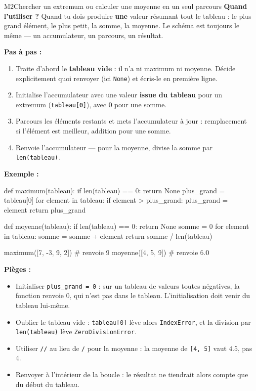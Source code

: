 \begin{fichemethode}{M2}{Chercher un extremum ou calculer une moyenne en un seul parcours}
\textbf{Quand l'utiliser ?} Quand tu dois produire \textbf{une} valeur résumant tout le
tableau : le plus grand élément, le plus petit, la somme, la moyenne. Le schéma est
toujours le même — un accumulateur, un parcours, un résultat.

\textbf{Pas à pas :}
\begin{enumerate}
  \item Traite d'abord le \textbf{tableau vide} : il n'a ni maximum ni moyenne. Décide
    explicitement quoi renvoyer (ici \lstinline{None}) et écris-le en première ligne.
  \item Initialise l'accumulateur avec une valeur \textbf{issue du tableau} pour un
    extremum (\lstinline{tableau[0]}), avec $0$ pour une somme.
  \item Parcours les éléments restants et mets l'accumulateur à jour : remplacement si
    l'élément est meilleur, addition pour une somme.
  \item Renvoie l'accumulateur — pour la moyenne, divise la somme par
    \lstinline{len(tableau)}.
\end{enumerate}

\textbf{Exemple :}
\begin{python}
def maximum(tableau):
    if len(tableau) == 0:
        return None
    plus_grand = tableau[0]
    for element in tableau:
        if element > plus_grand:
            plus_grand = element
    return plus_grand

def moyenne(tableau):
    if len(tableau) == 0:
        return None
    somme = 0
    for element in tableau:
        somme = somme + element
    return somme / len(tableau)

maximum([7, -3, 9, 2])    # renvoie 9
moyenne([4, 5, 9])        # renvoie 6.0
\end{python}

\textbf{Pièges :}
\begin{itemize}
  \item Initialiser \lstinline{plus_grand = 0} : sur un tableau de valeurs toutes
    négatives, la fonction renvoie $0$, qui n'est pas dans le tableau. L'initialisation
    doit venir du tableau lui-même.
  \item Oublier le tableau vide : \lstinline{tableau[0]} lève alors
    \lstinline{IndexError}, et la division par \lstinline{len(tableau)} lève
    \lstinline{ZeroDivisionError}.
  \item Utiliser \lstinline{//} au lieu de \lstinline{/} pour la moyenne : la moyenne de
    \lstinline{[4, 5]} vaut $4.5$, pas $4$.
  \item Renvoyer à l'intérieur de la boucle : le résultat ne tiendrait alors compte que du
    début du tableau.
\end{itemize}


\end{fichemethode}
